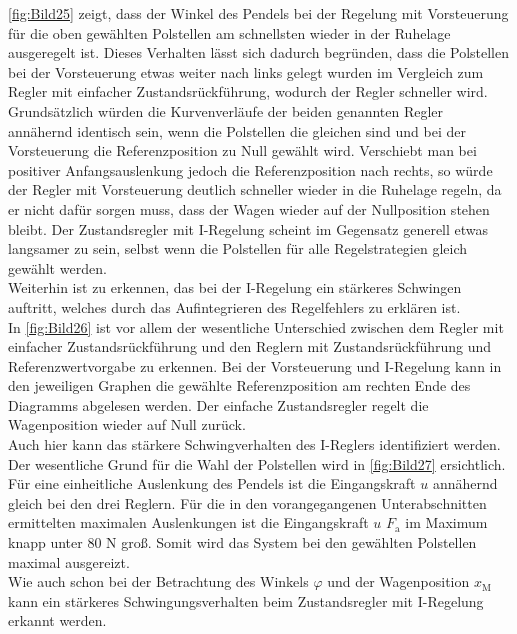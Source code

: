 \autoref{fig:Bild25} zeigt, dass der Winkel des Pendels bei der Regelung mit Vorsteuerung für die oben gewählten Polstellen am schnellsten wieder in der Ruhelage ausgeregelt ist. Dieses Verhalten lässt sich dadurch begründen, dass die Polstellen bei der Vorsteuerung etwas weiter nach links gelegt wurden im Vergleich zum Regler mit einfacher Zustandsrückführung, wodurch der Regler schneller wird. Grundsätzlich würden die Kurvenverläufe der beiden genannten Regler annähernd identisch sein, wenn die Polstellen die gleichen sind und bei der Vorsteuerung die Referenzposition zu Null gewählt wird. Verschiebt man bei positiver Anfangsauslenkung jedoch die Referenzposition nach rechts, so würde der Regler mit Vorsteuerung deutlich schneller wieder in die Ruhelage regeln, da er nicht dafür sorgen muss, dass der Wagen wieder auf der Nullposition stehen bleibt. Der Zustandsregler mit I-Regelung scheint im Gegensatz generell etwas langsamer zu sein, selbst wenn die Polstellen für alle Regelstrategien gleich gewählt werden. \\
Weiterhin ist zu erkennen, das bei der I-Regelung ein stärkeres Schwingen auftritt, welches durch das Aufintegrieren des Regelfehlers zu erklären ist. \\
\newline
In \autoref{fig:Bild26} ist vor allem der wesentliche Unterschied zwischen dem Regler mit einfacher Zustandsrückführung und den Reglern mit Zustandsrückführung und Referenzwertvorgabe zu erkennen. Bei der Vorsteuerung und I-Regelung kann in den jeweiligen Graphen die gewählte Referenzposition am rechten Ende des Diagramms abgelesen werden. Der einfache Zustandsregler regelt die Wagenposition wieder auf Null zurück. \\
Auch hier kann das stärkere Schwingverhalten des I-Reglers identifiziert werden. \\
\newline
Der wesentliche Grund für die Wahl der Polstellen wird in \autoref{fig:Bild27} ersichtlich. Für eine einheitliche Auslenkung des Pendels ist die Eingangskraft $u$ annähernd gleich bei den drei Reglern. Für die in den vorangegangenen Unterabschnitten ermittelten maximalen Auslenkungen ist die Eingangskraft $u$ \bzw $F_{\mathrm{a}}$ im Maximum knapp unter 80 N groß. Somit wird das System bei den gewählten Polstellen maximal ausgereizt. \\
Wie auch schon bei der Betrachtung des Winkels $\varphi$ und der Wagenposition $x_{\mathrm{M}}$ kann ein stärkeres Schwingungsverhalten beim Zustandsregler mit I-Regelung erkannt werden.

